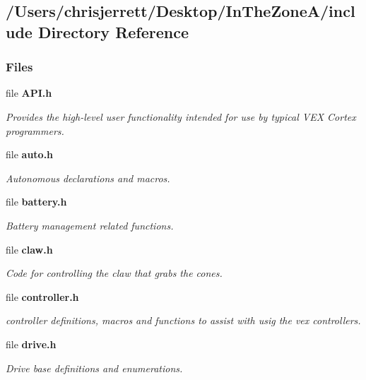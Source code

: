 \subsection{/\+Users/chrisjerrett/\+Desktop/\+In\+The\+Zone\+A/include Directory Reference}
\label{dir_6ac0038317b41e888e20499ce4f9acd1}
\subsubsection*{Files}
\begin{DoxyCompactItemize}
\item 
file \textbf{ A\+P\+I.\+h}
\begin{DoxyCompactList}\small\item\em Provides the high-\/level user functionality intended for use by typical V\+EX Cortex programmers. \end{DoxyCompactList}\item 
file \textbf{ auto.\+h}
\begin{DoxyCompactList}\small\item\em Autonomous declarations and macros. \end{DoxyCompactList}\item 
file \textbf{ battery.\+h}
\begin{DoxyCompactList}\small\item\em Battery management related functions. \end{DoxyCompactList}\item 
file \textbf{ claw.\+h}
\begin{DoxyCompactList}\small\item\em Code for controlling the claw that grabs the cones. \end{DoxyCompactList}\item 
file \textbf{ controller.\+h}
\begin{DoxyCompactList}\small\item\em controller definitions, macros and functions to assist with usig the vex controllers. \end{DoxyCompactList}\item 
file \textbf{ drive.\+h}
\begin{DoxyCompactList}\small\item\em Drive base definitions and enumerations. \end{DoxyCompactList}\item 

\end{DoxyCompactItemize}
